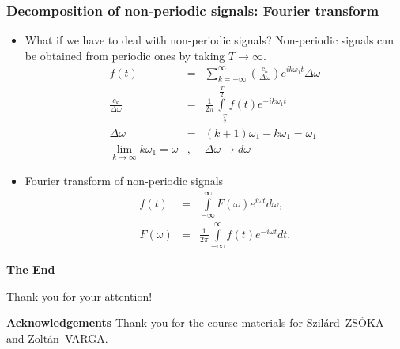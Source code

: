 \documentclass[t,aspectratio=169]{beamer}
\begin{document}
\begin{frame}
\begin{itemize}
\end{itemize}
\end{frame}


\begin{frame}
\frametitle{Decomposition of non-periodic signals: Fourier transform}
\begin{itemize}
\item What if we have to deal with non-periodic signals? Non-periodic signals can be obtained from periodic ones by taking $T\rightarrow\infty$.
\begin{eqnarray*}
  f(t)&=&\sum\limits_{k=-\infty}^{\infty}\left(\frac{c_{k}}{\Delta\omega}\right)e^{ik\omega_{1}t}\Delta\omega\\
  \frac{c_{k}}{\Delta\omega}&=&\frac{1}{2\pi}\int\limits_{-\frac{T}{2}}^{\frac{T}{2}}f(t)e^{-ik\omega_{1}t} \\
  \Delta\omega&=&(k+1)\omega_{1}-k\omega_{1}=\omega_{1}\\
  \lim\limits_{k\rightarrow\infty}k\omega_{1}=\omega &,& \Delta\omega \rightarrow d\omega
\end{eqnarray*}

\pagebreak
\item Fourier transform of non-periodic signals
\begin{eqnarray*}
  f(t)&=&\int\limits_{-\infty}^{\infty}F(\omega)e^{i\omega t}d\omega,\\
  F(\omega)&=&\frac{1}{2\pi}\int\limits_{-\infty}^{\infty}f(t)e^{-i\omega t}dt.
\end{eqnarray*}
\end{itemize}
\end{frame}



\begin{frame}

\vfill
\begin{center}
\textbf{\huge The End}

\bigskip
Thank you for your attention!
\end{center}
\vfill
\textbf{Acknowledgements} Thank you for the course materials for Szilárd~ZSÓKA and Zoltán~VARGA.
\end{frame}
\end{document}
